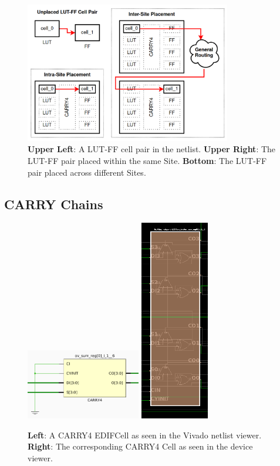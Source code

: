 \documentclass[twocolumn]{article}
\begin{document}
            \begin{figure}[H]
                \centering
                \includegraphics[width=9.0cm]{figures/intersite_intrasite_2.png}
                \caption{
                    \textbf{Upper Left}: A LUT-FF cell pair in the netlist.
                    \textbf{Upper Right}: The LUT-FF pair placed within the same Site.
                    \textbf{Bottom}: The LUT-FF pair placed across different Sites.
                }
                \label{fig:intrasite_intersite}
            \end{figure}



        \subsection{CARRY Chains}
            \begin{figure}[]
                \centering
                \includegraphics[width=5.0cm]{figures/carry_cell_edif.png}
                \includegraphics[width=3.0cm]{figures/carry_cell_device.png}
                \caption{
                    \textbf{Left}: A CARRY4 EDIFCell as seen in the Vivado netlist viewer.
                    \textbf{Right}: The corresponding CARRY4 Cell as seen in the device viewer.
                }
                \label{fig:carry_cell_edif}
            \end{figure}
\end{document}
